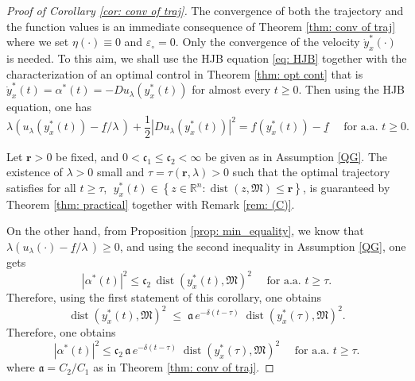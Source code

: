 \documentclass[12pt]{amsart}
\numberwithin{equation}{section}
\theoremstyle{plain}
\begin{document}
\begin{proof}[Proof of Corollary \ref{cor: conv of traj}]
The convergence of both the trajectory and the function values is an immediate consequence of Theorem \ref{thm: conv of traj} where we set $\eta(\cdot)\equiv 0$ and $\varepsilon_{\circ}=0$. Only the convergence of the velocity $\dot{y}_{x}^{*}(\cdot)$ is needed. To this aim, we shall use the HJB equation \eqref{eq: HJB} together with the characterization of an optimal control in Theorem \ref{thm: opt cont} that is $\dot{y}_{x}^{*}(t) = \alpha^{*}(t) = -Du_{\lambda}(y_{x}^{*}(t))$ for almost every $t\geq 0$. Then using the HJB equation, one has
\begin{equation*}
    \lambda(u_{\lambda}(y_{x}^{*}(t)) - \underline{f}/\lambda\,) + \frac{1}{2}|Du_{\lambda}(y_{x}^{*}(t))|^{2} = f(y_{x}^{*}(t)) - \underline{f}\quad \text{ for a.a. } t\geq 0.
\end{equation*}

Let $\mathbf{r}>0$ be fixed, and $0<\mathfrak{c}_{1}\leq \mathfrak{c}_{2}<\infty$ be given as in Assumption \ref{QG}. 
The existence of $\lambda>0$ small and $\tau = \tau(\mathbf{r},\lambda)>0$  such that the optimal trajectory satisfies for all $t\geq \tau$,  $\;y_{x}^{*}(t) \in \left\{z\in \mathbb{R}^{n}: \operatorname{dist}(z,\mathfrak{M})\leq \mathbf{r}\right\}$, is guaranteed by Theorem \ref{thm: practical} together with Remark \ref{rem: (C)}. 

On the other hand, from Proposition \ref{prop: min_equality}, we know that $ \lambda(u_{\lambda}(\cdot) - \underline{f}/\lambda\,)\geq 0$, and using the second inequality in Assumption \ref{QG}, one gets
\begin{equation*}
     |\alpha^{*}(t)|^{2} \leq \mathfrak{c}_{2} \, \operatorname{dist}(y_{x}^{*}(t),\mathfrak M)^2 \quad \text{ for a.a. } t\geq \tau.
\end{equation*}
Therefore, using the first statement of this corollary, one obtains
\begin{equation*}
    \operatorname{dist}(y_{x}^{*}(t),\mathfrak{M})^{2} 
    \;  \leq \;  
    \mathfrak{a}\,e^{-\delta(t-\tau)}\;\operatorname{dist}(y_{x}^{*}(\tau),\mathfrak{M})^{2}.
\end{equation*}
Therefore, one obtains
\begin{equation*}
     |\alpha^{*}(t)|^{2} \leq \mathfrak{c}_{2}\,\mathfrak{a} \, e^{-\delta(t-\tau)}\;\operatorname{dist}(y_{x}^{*}(\tau),\mathfrak M)^2 \quad \text{ for a.a. } t\geq \tau.
\end{equation*}
where  $\mathfrak{a}=C_{2}/C_{1}$ as in Theorem \ref{thm: conv of traj}.
\end{proof}
\end{document}
